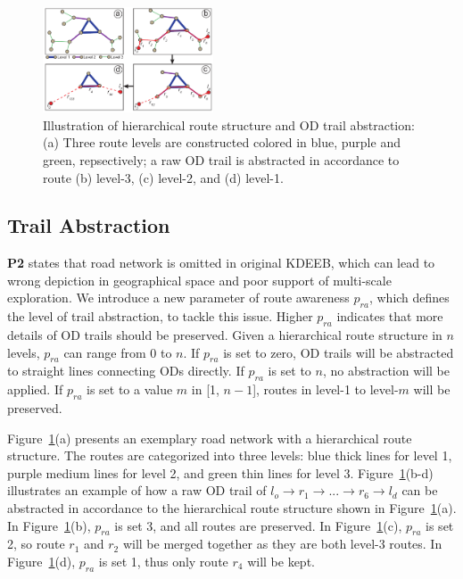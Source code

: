 \begin{figure}[t]
	\centering
	\includegraphics[width=0.45\textwidth]{figure/edgebundling/fig4_od_abstraction/OD_Abstraction.pdf}
	\vspace{-3mm}
	\caption{Illustration of hierarchical route structure and OD trail abstraction:
	(a) Three route levels are constructed colored in blue, purple and green, repsectively; a raw OD trail is abstracted in accordance to route (b) level-3, (c) level-2, and (d) level-1.}
	\label{fig:road_hierarchy}
	\vspace{-6mm}
\end{figure}

\subsection{Trail Abstraction}
\label{section: trail_abstraction}

\textbf{P2} states that road network is omitted in original KDEEB, which can lead to wrong depiction in geographical space and poor support of multi-scale exploration.
We introduce a new parameter of route awareness $p_{ra}$, which defines the level of trail abstraction, to tackle this issue.
Higher $p_{ra}$ indicates that more details of OD trails should be preserved.
Given a hierarchical route structure in $n$ levels, $p_{ra}$ can range from 0 to $n$.
If $p_{ra}$ is set to zero, OD trails will be abstracted to straight lines connecting ODs directly.
If $p_{ra}$ is set to $n$, no abstraction will be applied.
If $p_{ra}$ is set to a value $m$ in [1, $n-1$], routes in level-1 to level-$m$ will be preserved.

Figure~\ref{fig:road_hierarchy}(a) presents an exemplary road network with a hierarchical route structure.
The routes are categorized into three levels: blue thick lines for level 1, purple medium lines for level 2, and green thin lines for level 3.
Figure~\ref{fig:road_hierarchy}(b-d) illustrates an example of how a raw OD trail of $l_o \rightarrow r_1 
\rightarrow...\rightarrow r_6 \rightarrow l_d$ can be abstracted in accordance to the hierarchical route structure shown in Figure~\ref{fig:road_hierarchy}(a).
In Figure~\ref{fig:road_hierarchy}(b), $p_{ra}$ is set 3, and all routes are preserved.
In Figure~\ref{fig:road_hierarchy}(c), $p_{ra}$ is set 2, so route $r_1$ and $r_2$ will be merged together as they are both level-3 routes.
In Figure~\ref{fig:road_hierarchy}(d), $p_{ra}$ is set 1, thus only route $r_4$ will be kept.